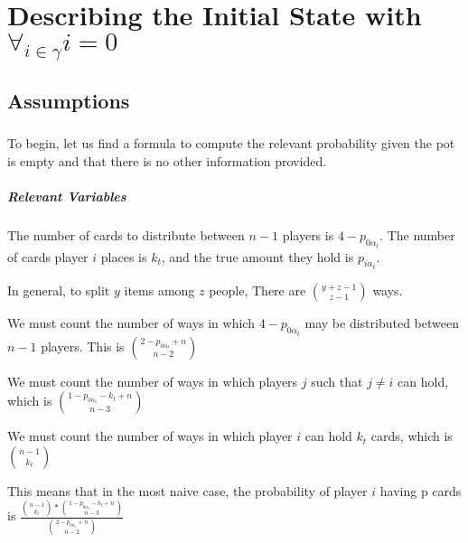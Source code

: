 \documentclass[letterpaper,11pt]{report}
\begin{document}
\chapter{Describing the Initial State with $\forall_{i\in\gamma} i = 0$}
\section{Assumptions} 
\paragraph*{} To begin, let us find a formula to compute the relevant probability given the pot is empty and that there is no other information provided.
\paragraph*{Relevant Variables} The number of cards to distribute between $n-1$ players is $4-p_{0 \alpha_{t}}$. The number of cards player $i$ places is $k_t$, and the true amount they hold is $p_{i \alpha_t}$.
\begin{description}
    \item In general, to split $y$ items among $z$ people, There are ${y+z-1 \choose z-1}$ ways.
    \item We must count the number of ways in which $4-p_{0 \alpha_{t}}$ may be distributed between $n-1$ players. This is ${2-p_{0 \alpha_{t}} + n \choose n-2}$
    \item We must count the number of ways in which players $j$ such that $j\neq i$ can hold, which is ${1-p_{0 \alpha_{t}} - k_t + n \choose n-3}$ 
    \item We must count the number of ways in which player $i$ can hold $k_t$ cards, which is ${n-1 \choose k_t}$
    \linebreak
    \item This means that in the most naive case, the probability of player $i$ having p cards is  $\frac{{n-1 \choose k_t}\ast{1-p_{0 \alpha_{t}} - k_t + n \choose n-3}}{{2-p_{0 \alpha_{t}} + n \choose n-2}}$
\end{description}
\end{document}
